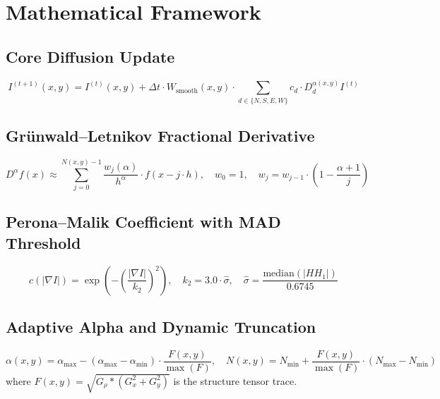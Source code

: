 \documentclass[12pt,a4paper]{article}
\begin{document}
\section{Mathematical Framework}

\subsection{Core Diffusion Update}

\begin{equation}
I^{(t+1)}(x,y) = I^{(t)}(x,y) + \Delta t \cdot W_{\text{smooth}}(x,y) \cdot \sum_{d \in \{N,S,E,W\}} c_d \cdot D^{\alpha(x,y)}_d I^{(t)}
\end{equation}

\subsection{Gr\"{u}nwald--Letnikov Fractional Derivative}

\begin{equation}
D^{\alpha} f(x) \approx \sum_{j=0}^{N(x,y)-1} \frac{w_j(\alpha)}{h^{\alpha}} \cdot f(x - j \cdot h), \quad w_0 = 1, \quad w_j = w_{j-1} \cdot \left(1 - \frac{\alpha + 1}{j}\right)
\end{equation}

\subsection{Perona--Malik Coefficient with MAD Threshold}

\begin{equation}
c(|\nabla I|) = \exp\left(-\left(\frac{|\nabla I|}{k_2}\right)^2\right), \quad k_2 = 3.0 \cdot \hat{\sigma}, \quad \hat{\sigma} = \frac{\text{median}(|HH_1|)}{0.6745}
\end{equation}

\subsection{Adaptive Alpha and Dynamic Truncation}

\begin{equation}
\alpha(x,y) = \alpha_{\max} - (\alpha_{\max} - \alpha_{\min}) \cdot \frac{F(x,y)}{\max(F)}, \quad N(x,y) = N_{\min} + \frac{F(x,y)}{\max(F)} \cdot (N_{\max} - N_{\min})
\end{equation}
where $F(x,y) = \sqrt{G_\rho * (G_x^2 + G_y^2)}$ is the structure tensor trace.
\end{document}
